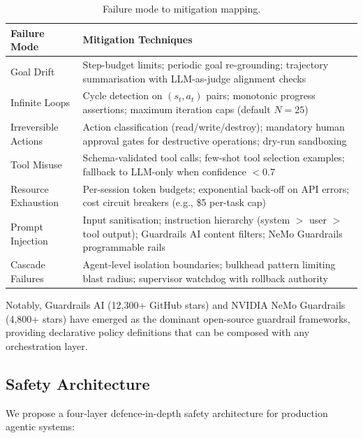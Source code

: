 \documentclass[12pt, a4paper]{article}
\begin{document}
\begin{table}[h]
\caption{Failure mode to mitigation mapping.}
\label{tab:mitigations}
\begin{tabular}{p{2.5cm}p{9cm}}
\toprule
\textbf{Failure Mode} & \textbf{Mitigation Techniques} \\
\midrule
Goal Drift & Step-budget limits; periodic goal re-grounding; trajectory summarisation with LLM-as-judge alignment checks \\
Infinite Loops & Cycle detection on $(s_t, a_t)$ pairs; monotonic progress assertions; maximum iteration caps (default $N{=}25$) \\
Irreversible Actions & Action classification (read/write/destroy); mandatory human approval gates for destructive operations; dry-run sandboxing \\
Tool Misuse & Schema-validated tool calls; few-shot tool selection examples; fallback to LLM-only when confidence $< 0.7$ \\
Resource Exhaustion & Per-session token budgets; exponential back-off on API errors; cost circuit breakers (e.g., \$5 per-task cap) \\
Prompt Injection & Input sanitisation; instruction hierarchy (system $>$ user $>$ tool output); Guardrails AI content filters; NeMo Guardrails programmable rails \\
Cascade Failures & Agent-level isolation boundaries; bulkhead pattern limiting blast radius; supervisor watchdog with rollback authority \\
\bottomrule
\end{tabular}
\end{table}

Notably, Guardrails AI (12,300+ GitHub stars) and NVIDIA NeMo Guardrails (4,800+ stars) have emerged as the dominant open-source guardrail frameworks, providing declarative policy definitions that can be composed with any orchestration layer.

\subsection{Safety Architecture}
We propose a four-layer defence-in-depth safety architecture for production agentic systems:
\end{document}
